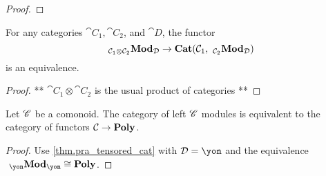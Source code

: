 \documentclass[Book-Poly]{subfiles}
\begin{document}
\begin{proof}
    
\end{proof}


\begin{corollary}\label{cor.tensored}
For any categories $\cat{C}_1, \cat{C}_2$, and $\cat{D}$, the functor
\[
    ~_{\mathcal{C}_1 \otimes \mathcal{C}_2}\textbf{Mod}_{\mathcal{D}} \to \textbf{Cat}(\mathcal{C}_1, ~_{\mathcal{C}_2}\textbf{Mod}_{\mathcal{D}})
\]
is an equivalence.
\end{corollary}
\begin{proof}
** $\cat{C}_1 \otimes \cat{C}_2$ is the usual product of categories **
\end{proof}


\begin{corollary}
Let $\mathscr{C}$ be a comonoid. The category of left $\mathscr{C}$ modules is equivalent to the category of functors $\mathcal{C}\to\textbf{Poly}$.
\end{corollary}
\begin{proof}
Use \cref{thm.pra_tensored_cat} with $\cat{D} = \yon$ and the equivalence $\bimod{\yon}{\yon} \cong \poly$.
\end{proof}
\end{document}
